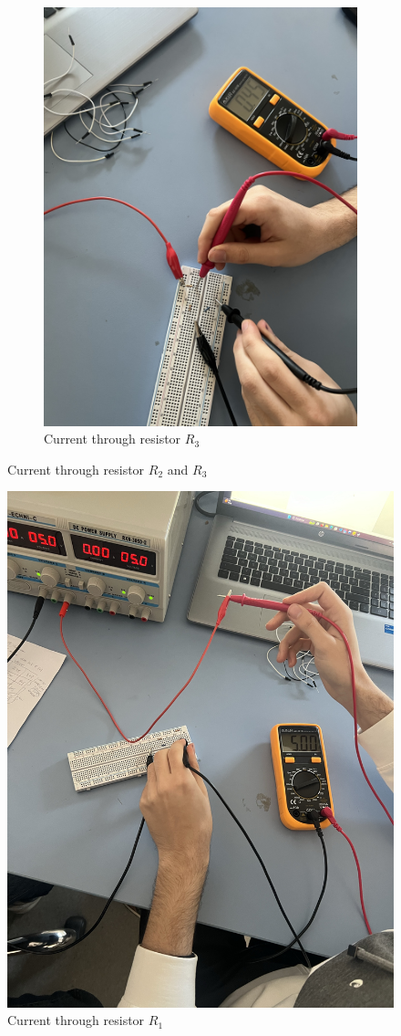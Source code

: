 \documentclass[a4paper, 10pt]{article}
\begin{document}
\begin{figure}[h!]
\begin{subfigure}{.45\textwidth}
						\includegraphics[width=\textwidth]{images/CurrentR3Circ3.jpeg}
						\caption{Current through resistor $R_3$}
						\label{subfig:CurrentR3Circ3}
					\end{subfigure}
					\caption{Current through resistor $R_2$ and $R_3$}
					\label{fig:CurrentR23Circ3}
				\end{figure}
				\begin{figure}[h!]
					\centering
					\includegraphics[width=.5\textwidth]{images/CurrentR1Circ3.jpeg}
					\caption{Current through resistor $R_1$}
					\label{fig:CurrentR1Circ3}
				\end{figure}
			\pagebreak
\end{document}
